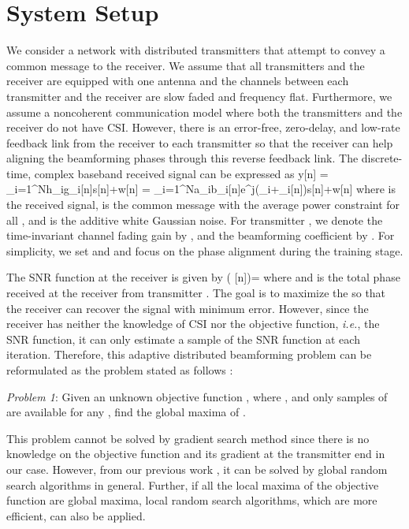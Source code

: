 \documentclass{article}
\newcommand{\beq}{}
\newcommand{\thetabm}{ {\boldsymbol{\theta}} }
\newcommand{\snr}{ {\mathrm{SNR}} }
\begin{document}
\vspace{-0.10cm}
\section{System Setup}\label{sec:syssetup}
\vspace{-0.20cm}
We consider a network with  distributed transmitters that attempt to convey a common message to the receiver. We assume that all transmitters and the receiver are equipped with one antenna and the channels between each transmitter and the receiver are slow faded and frequency flat. Furthermore, we assume a noncoherent communication model where both the transmitters and the receiver do not have CSI. However, there is an error-free, zero-delay, and low-rate feedback link from the receiver to each transmitter so that the receiver can help aligning the beamforming phases through this reverse feedback link. The discrete-time, complex baseband received signal can be expressed as 
\beq \label{eq:model}
y[n] = \sum_{i=1}^{N}h_ig_i[n]s[n]+w[n] = \sum_{i=1}^{N}a_ib_i[n]e^{j(\phi_i+\psi_i[n])}s[n]+w[n]
\eeq
where  is the received signal,  is the common message with the average power constraint  for all , and  is the additive white Gaussian noise. For transmitter , we denote the time-invariant channel fading gain by , and the beamforming coefficient by . 
For simplicity, we set  and  and focus on the phase alignment during the training stage.

The SNR function at the receiver is given by 
\beq \label{eq:snr}
\snr(\thetabm[n])=
\eeq
where  and  is the total phase received at the receiver from transmitter . 
The goal is to maximize the  so that the receiver can recover the signal with minimum error. However, since the receiver has neither the knowledge of CSI nor the objective function, \textit{i.e.}, the SNR function, it can only estimate a sample of the SNR function at each iteration. Therefore, this adaptive distributed beamforming problem can be reformulated as the problem stated as follows \cite{Lin10}:

\textit{Problem 1}: Given an unknown objective function , where , and only samples of  are available for any , find the global maxima of .

This problem cannot be solved by gradient search method since there is no knowledge on the objective function and its gradient at the transmitter end in our case. However, from our previous work \cite{Lin10}, it can be solved by global random search algorithms in general. Further, if all the local maxima of the objective function are global maxima, local random search algorithms, which are more efficient, can also be applied.
\end{document}
